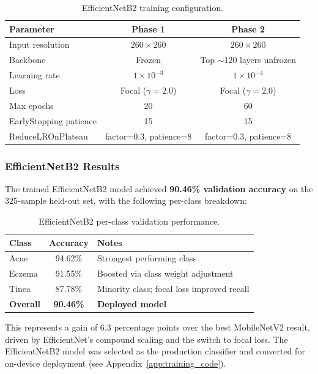 \begin{table}[H]
\centering
\caption{EfficientNetB2 training configuration.}
\label{tab:b2_config}
\begin{tabular}{|l|c|c|}
\hline
\textbf{Parameter} & \textbf{Phase 1} & \textbf{Phase 2} \\ \hline
Input resolution & $260 \times 260$ & $260 \times 260$ \\ \hline
Backbone & Frozen & Top $\sim$120 layers unfrozen \\ \hline
Learning rate & $1 \times 10^{-3}$ & $1 \times 10^{-4}$ \\ \hline
Loss & Focal ($\gamma = 2.0$) & Focal ($\gamma = 2.0$) \\ \hline
Max epochs & 20 & 60 \\ \hline
EarlyStopping patience & 15 & 15 \\ \hline
ReduceLROnPlateau & factor=0.3, patience=8 & factor=0.3, patience=8 \\ \hline
\end{tabular}
\end{table}

\subsubsection{EfficientNetB2 Results}

The trained EfficientNetB2 model achieved \textbf{90.46\% validation accuracy} on the 325-sample held-out set, with the following per-class breakdown:

\begin{table}[H]
\centering
\caption{EfficientNetB2 per-class validation performance.}
\label{tab:b2_results}
\begin{tabular}{|l|c|l|}
\hline
\textbf{Class} & \textbf{Accuracy} & \textbf{Notes} \\ \hline
Acne & 94.62\% & Strongest performing class \\ \hline
Eczema & 91.55\% & Boosted via class weight adjustment \\ \hline
Tinea & 87.78\% & Minority class; focal loss improved recall \\ \hline
\textbf{Overall} & \textbf{90.46\%} & \textbf{Deployed model} \\ \hline
\end{tabular}
\end{table}

This represents a gain of 6.3 percentage points over the best MobileNetV2 result, driven by EfficientNet's compound scaling and the switch to focal loss. The EfficientNetB2 model was selected as the production classifier and converted for on-device deployment (see Appendix~\ref{app:training_code}).



